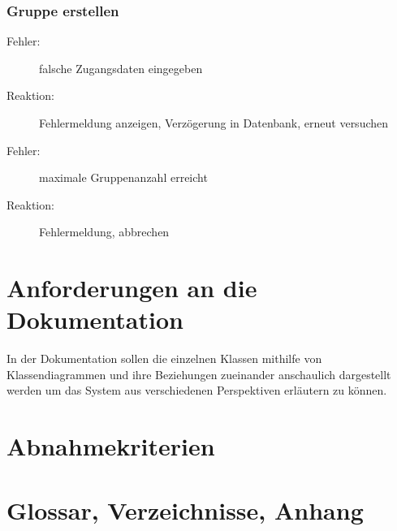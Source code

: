 \documentclass{article}
\begin{document}
\section{Gruppe erstellen}
\begin{description}
\item[Fehler:] falsche Zugangsdaten eingegeben
\item[Reaktion:] Fehlermeldung anzeigen, Verzögerung in Datenbank, erneut versuchen
\end{description}
\begin{description}
\item[Fehler:] maximale Gruppenanzahl erreicht
\item[Reaktion:] Fehlermeldung, abbrechen
\end{description}


\newpage
\part{Anforderungen an die Dokumentation}
In der Dokumentation sollen die einzelnen Klassen mithilfe von Klassendiagrammen
und ihre Beziehungen zueinander anschaulich dargestellt werden um das System aus
verschiedenen Perspektiven erläutern zu können.

\newpage
\part{Abnahmekriterien}


\newpage
\part{Glossar, Verzeichnisse, Anhang}
\end{document}

